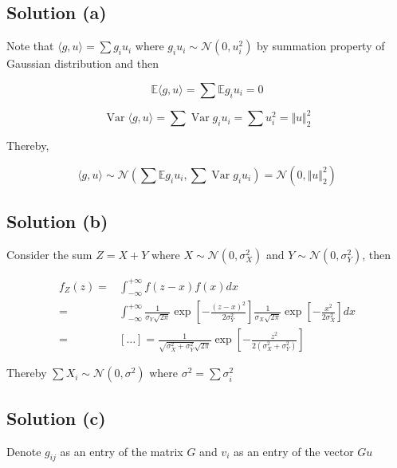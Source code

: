 \documentclass{article}
\DeclareMathOperator{\Var}{Var}
\begin{document}
\subsection{Solution (a)}

Note that $\langle g, u \rangle = \sum g_iu_i$ where $g_iu_i \sim \mathcal N (0, u_i^2)$ by summation property of Gaussian distribution and then

$$\mathbb E \langle g, u \rangle = \sum \mathbb E g_iu_i = 0$$

$$\Var \langle g, u \rangle = \sum \Var g_iu_i = \sum u_i^2 = \Vert u \Vert^2_2$$

Thereby, 

$$\langle g, u \rangle \sim \mathcal N \left(\sum \mathbb E g_iu_i, \sum \Var g_iu_i \right) = \mathcal N(0, \Vert u \Vert^2_2)$$

\subsection{Solution (b)}

Consider the sum $Z = X + Y$ where $X \sim \mathcal N(0, \sigma_X^2)$ and $Y \sim \mathcal N(0, \sigma_Y^2)$, then

\begin{equation*}
    \begin{aligned}
        f_Z(z) = & \int_{-\infty}^{+\infty} f(z-x)f(x)dx \\
        = & \int_{-\infty}^{+\infty} \frac{1}{\sigma_Y\sqrt{2 \pi}} \exp \left[ -\frac{(z - x)^2}{2 \sigma_Y^2} \right] \frac{1}{\sigma_X\sqrt{2 \pi}} \exp \left[ -\frac{x^2}{2 \sigma_X^2} \right] dx \\
        = & [\dots] = \frac{1}{\sqrt{\sigma_X^2 + \sigma_Y^2}\sqrt{2 \pi}} \exp \left[ -\frac{z^2}{2 (\sigma_X^2 + \sigma_Y^2)} \right]
    \end{aligned}
\end{equation*}

Thereby $\sum X_i \sim \mathcal N(0, \sigma^2)$ where $\sigma^2 = \sum \sigma_i^2$

\subsection{Solution (c)}

Denote $g_{ij}$ as an entry of the matrix $G$ and $v_i$ as an entry of the vector $Gu$
\end{document}
